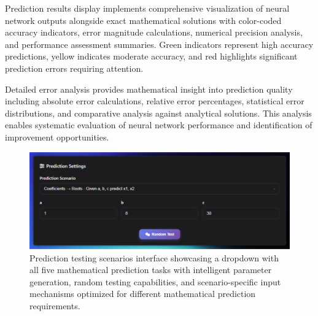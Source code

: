 \documentclass[11pt,a4paper]{report}
\begin{document}
Prediction results display implements comprehensive visualization of neural network outputs alongside exact mathematical solutions with color-coded accuracy indicators, error magnitude calculations, numerical precision analysis, and performance assessment summaries. Green indicators represent high accuracy predictions, yellow indicates moderate accuracy, and red highlights significant prediction errors requiring attention.

Detailed error analysis provides mathematical insight into prediction quality including absolute error calculations, relative error percentages, statistical error distributions, and comparative analysis against analytical solutions. This analysis enables systematic evaluation of neural network performance and identification of improvement opportunities.

\begin{figure}[H]
\centering
\includegraphics[width=\textwidth]{quadratic_predictor_prediction_scenarios.png}
\caption{Prediction testing scenarios interface showcasing a dropdown with all five mathematical prediction tasks with intelligent parameter generation, random testing capabilities, and scenario-specific input mechanisms optimized for different mathematical prediction requirements.}
\label{fig:quadratic_prediction_scenarios}
\end{figure}
\end{document}
